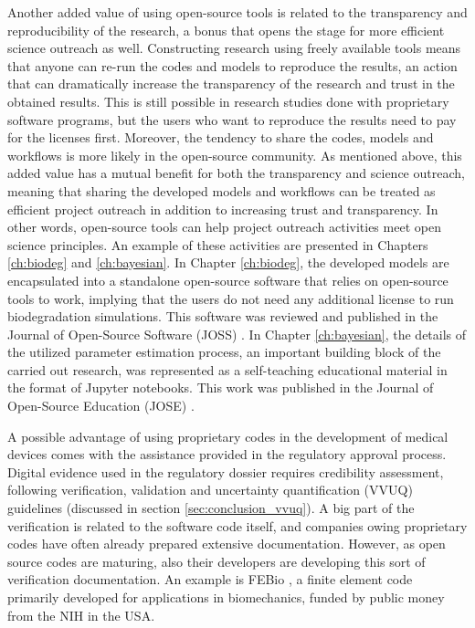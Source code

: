 Another added value of using open-source tools is related to the transparency and reproducibility of the research, a bonus that opens the stage for more efficient science outreach as well. Constructing research using freely available tools means that anyone can re-run the codes and models to reproduce the results, an action that can dramatically increase the transparency of the research and trust in the obtained results. This is still possible in research studies done with proprietary software programs, but the users who want to reproduce the results need to pay for the licenses first. Moreover, the tendency to share the codes, models and workflows is more likely in the open-source community. As mentioned above, this added value has a mutual benefit for both the transparency and science outreach, meaning that sharing the developed models and workflows can be treated as efficient project outreach in addition to increasing trust and transparency. In other words, open-source tools can help project outreach activities meet open science principles. An example of these activities are presented in Chapters \ref{ch:biodeg} and \ref{ch:bayesian}. In Chapter \ref{ch:biodeg}, the developed models are encapsulated into a standalone open-source software that relies on open-source tools to work, implying that the users do not need any additional license to run biodegradation simulations. This software was reviewed and published in the Journal of Open-Source Software (JOSS) \cite{Barzegari2022JOSS}. In Chapter \ref{ch:bayesian}, the details of the utilized parameter estimation process, an important building block of the carried out research, was represented as a self-teaching educational material in the format of Jupyter notebooks. This work was published in the Journal of Open-Source Education (JOSE) \cite{Barzegari2021JOSE}.

A possible advantage of using proprietary codes in the development of medical devices comes with the assistance provided in the regulatory approval process. Digital evidence used in the regulatory dossier requires credibility assessment, following verification, validation and uncertainty quantification (\gls{VVUQ}) guidelines (discussed in section \ref{sec:conclusion_vvuq}).  A big part of the verification is related to the software code itself, and companies owing proprietary codes have often already prepared extensive documentation.  However, as open source codes are maturing, also their developers are developing this sort of verification documentation. An example is FEBio \cite{Maas2012}, a finite element code primarily developed for applications in biomechanics, funded by public money from the NIH in the USA.

